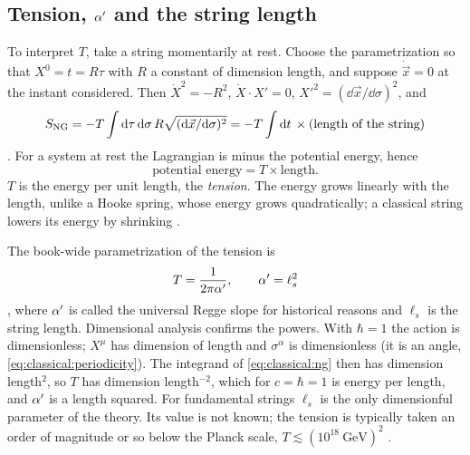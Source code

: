 \subsection{Tension, \texorpdfstring{$\alpha'$}{alpha'} and the string length}

To interpret $T$, take a string momentarily at rest. Choose the parametrization so that
$X^0=t=R\tau$ with $R$ a constant of dimension length, and suppose $\dot{\vec x}=0$ at the
instant considered. Then $\dot X^2=-R^2$, $\dot X\cdot X'=0$, $X'^2=(\dd\vec x/\dd\sigma)^2$, and
\begin{equation}\label{eq:classical:tension}
  S_{\rm NG}=-T\int\mathrm{d}\tau\,\mathrm{d}\sigma\,R\sqrt{(\mathrm{d}\vec x/\mathrm{d}\sigma)^2}
   =-T\int\mathrm{d} t\,\times(\text{length of the string})
\end{equation}
. For a system at rest the Lagrangian is minus the potential
energy, hence
\[
  \text{potential energy}=T\times\text{length}.
\]
$T$ is the energy per unit length, the \emph{tension}. The energy
grows linearly with the length, unlike a Hooke spring, whose energy grows quadratically; a
classical string lowers its energy by shrinking .

The book-wide parametrization of the tension is
\begin{equation}\label{eq:classical:alphaprime}
  T=\frac{1}{2\pi\alpha'},\qquad \alpha'=\ell_s^2
\end{equation}
, where $\alpha'$ is called the
universal Regge slope for historical reasons and $\ell_s$ is the string
length. Dimensional analysis confirms the powers. With $\hbar=1$ the action is dimensionless;
$X^\mu$ has dimension of length and $\sigma^\alpha$ is dimensionless (it is an angle,
\cref{eq:classical:periodicity}). The integrand of \eqref{eq:classical:ng} then has dimension
length$^2$, so $T$ has dimension length$^{-2}$, which for $c=\hbar=1$ is energy per length, and
$\alpha'$ is a length squared. For fundamental strings $\ell_s$ is the only dimensionful
parameter of the theory. Its value is not known; the tension is typically taken an order of
magnitude or so below the Planck scale, $T\lesssim(10^{18}\ \text{GeV})^2$
.

